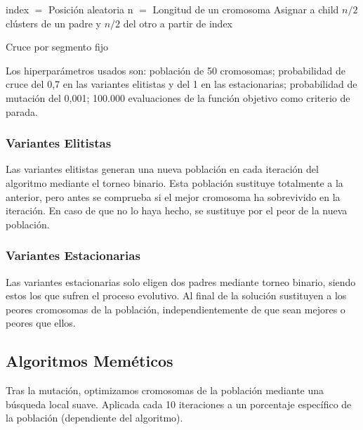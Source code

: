 \begin{algorithm}[H]
    \SetAlgoLined
        index $=$ Posición aleatoria \;
        n $=$ Longitud de un cromosoma \;
        Asignar a child $n/2$ clústers de un padre y $n/2$ del otro a partir de index \;
    \caption{Cruce por segmento fijo}
\end{algorithm}

\vspace{\baselineskip}

Los hiperparámetros usados son: población de 50 cromosomas; probabilidad de cruce del 0,7 en las variantes elitistas y del 1 en las estacionarias; probabilidad de mutación del 0,001; 100.000 evaluaciones de la función objetivo como criterio de parada.

\subsubsection{Variantes Elitistas}

Las variantes elitistas generan una nueva población en cada iteración del algoritmo mediante el torneo binario. Esta población sustituye totalmente a la anterior, pero antes se comprueba si el mejor cromosoma ha sobrevivido en la iteración. En caso de que no lo haya hecho, se sustituye por el peor de la nueva población.

\subsubsection{Variantes Estacionarias}

Las variantes estacionarias solo eligen dos padres mediante torneo binario, siendo estos los que sufren el proceso evolutivo. Al final de la solución sustituyen a los peores cromosomas de la población, independientemente de que sean mejores o peores que ellos.

\newpage


\subsection{Algoritmos Meméticos}

Tras la mutación, optimizamos cromosomas de la población mediante una búsqueda local suave. Aplicada cada 10 iteraciones a un porcentaje específico de la población (dependiente del algoritmo). \\


